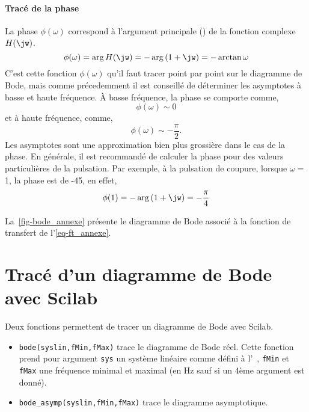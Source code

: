 \paragraph{Tracé de la phase}
La phase $\phi(\omega)$ correspond à l'argument principale () 
de la fonction complexe $H(\jw)$.
$$
\phi(\omega)=\arg{H(\jw)}=-\arg{(1+\jw)}=-\arctan{\omega}
$$
C'est cette fonction $\phi(\omega)$ qu'il faut tracer point par point 
sur le diagramme de Bode, mais comme précedemment
il est conseillé de déterminer les asymptotes à basse et haute fréquence.
\`A basse fréquence, la phase se comporte comme,
$$
\phi(\omega)\sim 0
$$ 
et à haute fréquence, comme, 
$$
\phi(\omega)\sim -\dfrac{\pi}{2}.
$$
Les asymptotes sont une approximation bien plus 
grossière dans le cas de la phase. 
En générale, il est recommandé de 
calculer la phase pour des valeurs particulières de la 
pulsation. Par exemple, à la pulsation de coupure, 
lorsque $\omega=$1, la phase est de -45\degree, en effet,
$$
\phi(1)=-\arg{(1+\jw)}=-\dfrac{\pi}{4}
$$

La~\cref{fig-bode_annexe} présente le diagramme de Bode associé à 
la fonction de transfert de l'\cref{eq-ft_annexe}.

\newpage
\section{Tracé d'un diagramme de Bode avec Scilab}
Deux fonctions permettent de tracer un diagramme de Bode avec Scilab.
\begin{itemize}
    \item \verb?bode(syslin,fMin,fMax)? trace le diagramme de Bode réel. 
          Cette fonction prend pour argument \verb?sys? un système linéaire 
          comme défini à l'~, \verb?fMin? et \verb?fMax? 
          une fréquence minimal et maximal (en \si{\hertz} sauf si un 
          4ème argument est donné). 
    \item \verb?bode_asymp(syslin,fMin,fMax)? trace le diagramme asymptotique.
\end{itemize}


